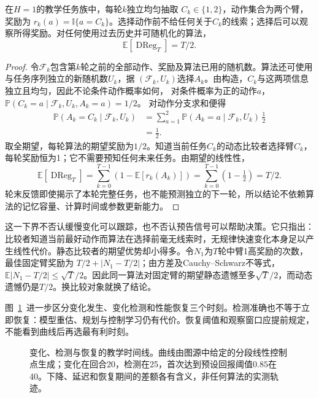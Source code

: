 \begin{theorem}[无预告快速变化的两臂下界]
 \label{thm:rl-transfer-linear-regret}
 在$H=1$的教学任务族中，每轮$k$独立均匀抽取
 $C_k\in\{1,2\}$，动作集合为两个臂，奖励为
 $r_k(a)=\mathbb I\{a=C_k\}$。选择动作前不给任何关于$C_k$的线索；选择后可以观察所得奖励。对任何使用过去历史并可随机化的算法，
 \[
 \mathbb E[\operatorname{DReg}_T]=T/2.
 \]
\end{theorem}

\begin{proof}
 令$\mathcal F_k$包含第$k$轮之前的全部动作、奖励及算法已用的随机数。算法还可使用与任务序列独立的新随机数$U_k$，据
 $(\mathcal F_k,U_k)$选择$A_k$。由构造，$C_k$与这两项信息独立且均匀，因此不论条件动作概率如何，
 对条件概率为正的动作$a$，
 $\mathbb P(C_k=a\mid\mathcal F_k,U_k,A_k=a)=1/2$。
 对动作分支求和便得
 \begin{align*}
 \mathbb P(A_k=C_k\mid\mathcal F_k,U_k)
 &=\sum_{a=1}^2
    \mathbb P(A_k=a\mid\mathcal F_k,U_k)\,\tfrac12\\
 &=\tfrac12.
 \end{align*}
 取全期望，每轮算法的期望奖励为$1/2$。知道当前任务$C_k$的动态比较者选择臂$C_k$，每轮奖励恒为1；它不需要预知任何未来任务。由期望的线性性，
 \[
 \mathbb E[\operatorname{DReg}_T]
 =\sum_{k=0}^{T-1}\left(1-\mathbb E[r_k(A_k)]\right)
 =\sum_{k=0}^{T-1}(1-\tfrac12)=T/2.
 \]
 轮末反馈即使揭示了本轮完整任务，也不能预测独立的下一轮，所以结论不依赖算法的记忆容量、计算时间或参数更新能力。
\end{proof}

这一下界不否认缓慢变化可以跟踪，也不否认预告信号可以帮助决策。它只指出：比较者知道当前最好动作而算法在选择前毫无线索时，无规律快速变化本身足以产生线性代价。静态比较者的期望优势却小得多。令$N_1$为$T$轮中臂1高奖励的次数，最佳固定臂奖励为
$T/2+|N_1-T/2|$；由方差及Cauchy--Schwarz不等式，
$\mathbb E|N_1-T/2|\leq\sqrt{T}/2$。因此同一算法对固定臂的期望静态遗憾至多$\sqrt{T}/2$，而动态遗憾仍是$T/2$。换比较对象就换了结论。

图~\ref{fig:rl-transfer-tracking}~进一步区分变化发生、变化检测和性能恢复三个时刻。检测准确也不等于立即恢复：模型重估、规划与控制学习仍有代价。恢复阈值和观察窗口应提前规定，不能看到曲线后再选最有利时刻。

\begin{figure}[htbp]
 \centering
 
 \caption{变化、检测与恢复的教学时间线。曲线由图源中给定的分段线性控制点生成；变化在回合20，检测在25，首次达到预设回报阈值$0.85$在40。下降、延迟和恢复期间的差额各有含义，非任何算法的实测轨迹。}
 \label{fig:rl-transfer-tracking}
\end{figure}

